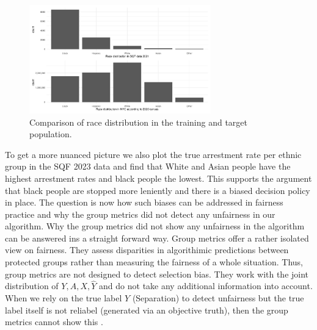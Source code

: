 \begin{figure}
    \centering
    \includegraphics[width=0.7\textwidth]{../figures/sqf_case_study_plot6.png}
    \caption{Comparison of race distribution in the training and target population.}
    \label{fig:race_distributions}
\end{figure}

To get a more nuanced picture we also plot the true arrestment rate per ethnic group in the SQF 2023 data and find that White and Asian people have the highest arrestment rates and black people the lowest. This supports the argument that black people are stopped more leniently and there is a biased decision policy in place. The question is now how such biases can be addressed in fairness practice and why the group metrics did not detect any unfairness in our algorithm.
Why the group metrics did not show any unfairness in the algorithm can be answered ins a straight forward way. Group metrics offer a rather isolated view on fairness. They assess disparities in algorithimic predictions between protected groups rather than measuring the fairness of a whole situation. Thus, group metrics are not designed to detect selection bias. They work with the joint distribution of $Y, A, X, \hat{Y}$ and do not take any additional information into account. When we rely on the true label $Y$ (Separation) to detect unfairness but the true label itself is not reliabel (generated via an objective truth), then the group metrics cannot show this \cite{castelnovo2022}.

